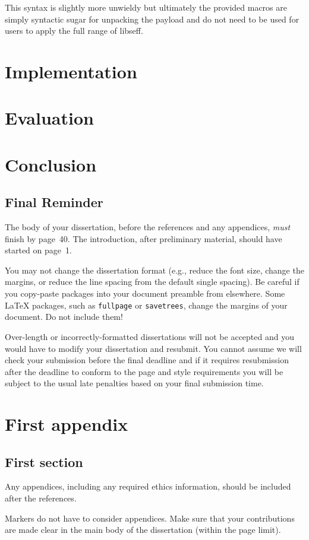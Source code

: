 \documentclass[logo,bsc,singlespacing,parskip,online]{infthesis}
\begin{document}
This syntax is slightly more unwieldy but ultimately the provided macros are simply syntactic sugar for unpacking the payload and do not need to be used for users to apply the full range of libseff.

\chapter{Implementation}

\chapter{Evaluation}

\chapter{Conclusion}

\section{Final Reminder}

The body of your dissertation, before the references and any appendices,
\emph{must} finish by page~40. The introduction, after preliminary material,
should have started on page~1.

You may not change the dissertation format (e.g., reduce the font size, change
the margins, or reduce the line spacing from the default single spacing). Be
careful if you copy-paste packages into your document preamble from elsewhere.
Some \LaTeX{} packages, such as \texttt{fullpage} or \texttt{savetrees}, change
the margins of your document. Do not include them!

Over-length or incorrectly-formatted dissertations will not be accepted and you
would have to modify your dissertation and resubmit. You cannot assume we will
check your submission before the final deadline and if it requires resubmission
after the deadline to conform to the page and style requirements you will be
subject to the usual late penalties based on your final submission time.

% 




\appendix

\chapter{First appendix}

\section{First section}

Any appendices, including any required ethics information, should be included
after the references.

Markers do not have to consider appendices. Make sure that your contributions
are made clear in the main body of the dissertation (within the page limit).
\end{document}
